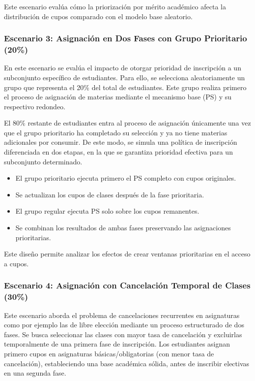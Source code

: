 \documentclass{article}
\begin{document}
 Este escenario evalúa cómo la priorización por mérito académico afecta la distribución de cupos comparado con el modelo base aleatorio.

\subsubsection{Escenario 3: Asignación en Dos Fases con Grupo Prioritario (20\%)}
En este escenario se evalúa el impacto de otorgar prioridad de inscripción a un subconjunto 
específico de estudiantes. Para ello, se selecciona aleatoriamente un grupo que representa el 
20\% del total de estudiantes. Este grupo realiza primero el proceso de asignación de materias 
mediante el mecanismo base (PS) y su respectivo redondeo.

El 80\% restante de estudiantes entra al proceso de asignación únicamente una vez que el grupo 
prioritario ha completado su selección y ya no tiene materias adicionales por consumir. 
De este modo, se simula una política de inscripción diferenciada en dos etapas, en la que se 
garantiza prioridad efectiva para un subconjunto determinado.


\begin{itemize}
\item El grupo prioritario ejecuta primero el PS completo con cupos originales.
\item Se actualizan los cupos de clases después de la fase prioritaria.
\item El grupo regular ejecuta PS solo sobre los cupos remanentes.
\item Se combinan los resultados de ambas fases preservando las asignaciones prioritarias.
\end{itemize}

Este diseño permite analizar los efectos de crear ventanas prioritarias en el acceso a cupos.

\subsubsection{Escenario 4: Asignación con Cancelación Temporal de Clases (30\%)}

Este escenario aborda el problema de cancelaciones recurrentes en asignaturas como por ejemplo las de libre elección
 mediante un proceso estructurado de dos fases. Se busca seleccionar las clases con mayor tasa de cancelación
  y excluirlas temporalmente de una primera fase de inscripción. Los estudiantes asignan primero cupos en asignaturas básicas/obligatorias
   (con menor tasa de cancelación),
  estableciendo una base académica sólida, antes de inscribir electivas en una segunda fase. 
\end{document}
